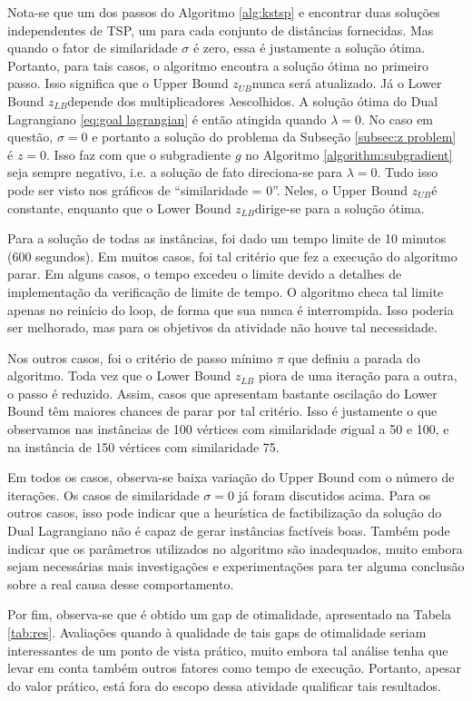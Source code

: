 \documentclass{article}
\newcommand{\Z}{\ensuremath{z}}
\newcommand{\similarity}{\ensuremath{\sigma}}
\newcommand{\lowerbound}{\ensuremath{z_{LB}}}
\newcommand{\upperbound}{\ensuremath{z_{UB}}}
\newcommand{\learningrate}{\ensuremath{\pi}}
\newcommand{\lagrange}{\ensuremath{\lambda}}
\begin{document}
Nota-se que um dos passos do Algoritmo \ref{alg:kstsp} e encontrar duas soluções independentes de TSP, um para cada conjunto de distâncias fornecidas. Mas quando o fator de similaridade $\similarity$ é zero, essa é justamente a solução ótima. Portanto, para tais casos, o algoritmo encontra a solução ótima no primeiro passo. Isso significa que o Upper Bound \upperbound nunca será atualizado. Já o Lower Bound \lowerbound depende dos multiplicadores \lagrange escolhidos. A solução ótima do Dual Lagrangiano \ref{eq:goal lagrangian} é então atingida quando $\lagrange = 0$. No caso em questão, $\similarity = 0$ e portanto a solução do problema da Subseção \ref{subsec:z problem} é $\Z = 0$. Isso faz com que o subgradiente $g$ no Algoritmo \ref{algorithm:subgradient} seja sempre negativo, i.e. a solução de fato direciona-se para $\lagrange = 0$. Tudo isso pode ser visto nos gráficos de ``similaridade = 0''. Neles, o Upper Bound \upperbound é constante, enquanto que o Lower Bound \lowerbound dirige-se para a solução ótima.

Para a solução de todas as instâncias, foi dado um tempo limite de 10 minutos (600 segundos). Em muitos casos, foi tal critério que fez a execução do algoritmo parar. Em alguns casos, o tempo excedeu o limite devido a detalhes de implementação da verificação de limite de tempo. O algoritmo checa tal limite apenas no reinício do loop, de forma que sua nunca é interrompida. Isso poderia ser melhorado, mas para os objetivos da atividade não houve tal necessidade.

Nos outros casos, foi o critério de passo mínimo $\learningrate$ que definiu a parada do algoritmo. Toda vez que o Lower Bound $\lowerbound$ piora de uma iteração para a outra, o passo é reduzido. Assim, casos que apresentam bastante oscilação do Lower Bound têm maiores chances de parar por tal critério. Isso é justamente o que observamos nas instâncias de 100 vértices com similaridade \similarity igual a 50 e 100, e na instância de 150 vértices com similaridade 75.

Em todos os casos, observa-se baixa variação do Upper Bound com o número de iterações. Os casos de similaridade $\similarity = 0$ já foram discutidos acima. Para os outros casos, isso pode indicar que a heurística de factibilização da solução do Dual Lagrangiano não é capaz de gerar instâncias factíveis boas. Também pode indicar que os parâmetros utilizados no algoritmo são inadequados, muito embora sejam necessárias mais investigações e experimentações para ter alguma conclusão sobre a real causa desse comportamento.

Por fim, observa-se que é obtido um gap de otimalidade, apresentado na Tabela \ref{tab:res}. Avaliações quando à qualidade de tais gaps de otimalidade seriam interessantes de um ponto de vista prático, muito embora tal análise tenha que levar em conta também outros fatores como tempo de execução. Portanto, apesar do valor prático, está fora do escopo dessa atividade qualificar tais resultados.



\end{document}
